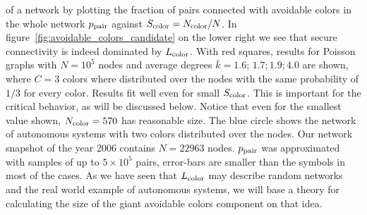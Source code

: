 \documentclass[aps, pre, twocolumn, a4paper, floatfix]{revtex4}
\begin{document}
of a network by plotting the fraction of pairs connected with avoidable colors in the 
whole network $p_{\rm pair}$ against $S_{\rm color}=N_{\rm color}/N$. In 
figure~\ref{fig:avoidable_colors_candidate} on the lower right we see that secure 
connectivity is indeed dominated by $L_{\rm color}$. With red squares, results for 
Poisson graphs with $N=10^5$ nodes and average degrees ${\bar k}=1.6;\,1.7;1.9;4.0$
are shown, where $C=3$ colors where distributed over the nodes with the same probability
of $1/3$ for every color. Results fit well even for small $S_{\rm color}$. This is 
important for the critical behavior, as will be discussed below. Notice that even for 
the smallest value shown, $N_{\rm color}=570$ has reasonable size. The blue circle shows 
the network of autonomous systems with two colors distributed over the nodes. Our network 
snapshot of the year 2006 contains $N=22963$ nodes. $p_{\rm pair}$ was approximated with 
samples of up to $5\times 10^5$ pairs, error-bars are smaller than the symbols in most 
of the cases. 
As we have seen that $L_{\rm color}$ may describe random networks and the real world 
example of autonomous systems, we will base a theory for calculating the size of 
the giant avoidable colors component on that idea. 
\end{document}
